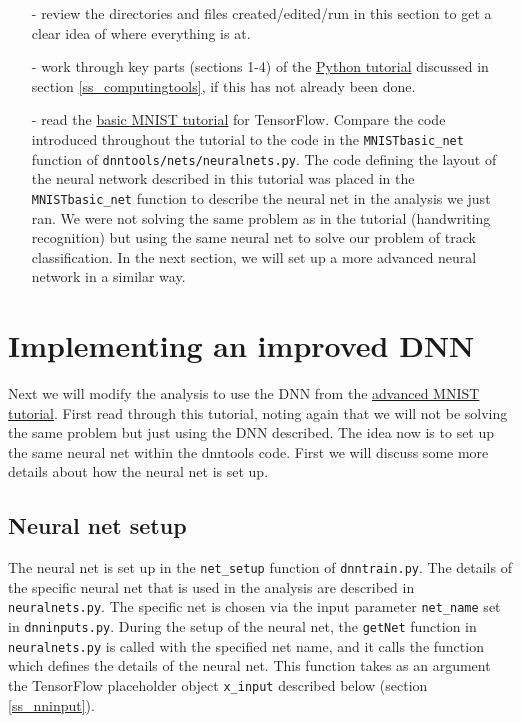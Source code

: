 \documentclass[10pt]{article}
\begin{document}
\begin{enumerate}
	\item[-] review the directories and files created/edited/run in this section to get a clear idea of where everything is at.
	\item[-] work through key parts (sections 1-4) of the \href{https://docs.python.org/2/tutorial/}{Python tutorial} discussed in section \ref{ss_computingtools}, if this has not already been done.
	\item[-] read the \href{https://www.tensorflow.org/versions/r0.7/tutorials/mnist/beginners/index.html}{basic MNIST tutorial} for TensorFlow.  Compare the code introduced throughout the tutorial
	to the code in the \verb|MNISTbasic_net| function of \verb|dnntools/nets/neuralnets.py|.  The code defining the layout of the neural network described in this tutorial was placed in the 
	\verb|MNISTbasic_net| function to describe the neural net
	in the analysis we just ran.  We were not solving the same problem as in the tutorial (handwriting recognition) but using the same neural net to solve our problem of track classification.  In the next section, we will set up a 
	more advanced neural network in a similar way.
\end{enumerate}

\section{Implementing an improved DNN}\label{s_mnistadv}
\noindent Next we will modify the analysis to use the DNN from the \href{https://www.tensorflow.org/versions/r0.7/tutorials/mnist/pros/index.html}{advanced MNIST tutorial}.  First read through this tutorial, noting again that
we will not be solving the same problem but just using the DNN described.  The idea now is to set up the same neural net within the dnntools code.  First we will discuss some more details
about how the neural net is set up.

\subsection{Neural net setup}
\noindent The neural net is set up in the \verb|net_setup| function of \verb|dnntrain.py|.  The details of the specific neural net that is used in the analysis are described in \verb|neuralnets.py|.
The specific net is chosen via the input parameter \verb|net_name| set in \verb|dnninputs.py|.  During the setup of the neural net, the 
\verb|getNet| function in \verb|neuralnets.py| is called with the specified net name, and it calls the function which defines the details of the neural net.  This function takes as an argument
the TensorFlow placeholder object \verb|x_input| described below (section \ref{ss_nninput}).
\end{document}
